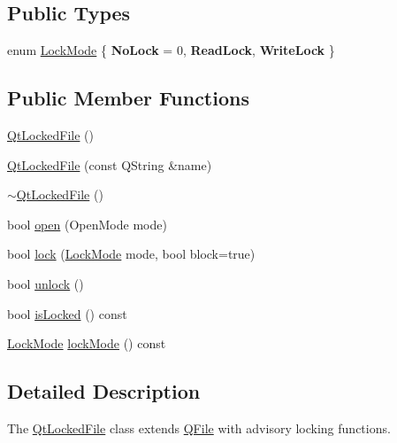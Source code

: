 \subsection*{Public Types}
\begin{DoxyCompactItemize}
\item 
enum \hyperlink{class_qt_l_p___private_1_1_qt_locked_file_ab9a54228983e33cf1fb8dace52141f26}{Lock\+Mode} \{ {\bfseries No\+Lock} = 0, 
{\bfseries Read\+Lock}, 
{\bfseries Write\+Lock}
 \}
\end{DoxyCompactItemize}
\subsection*{Public Member Functions}
\begin{DoxyCompactItemize}
\item 
\hyperlink{class_qt_l_p___private_1_1_qt_locked_file_a69bf1d82b1ca46f97466634d8f9587aa}{Qt\+Locked\+File} ()
\item 
\hyperlink{class_qt_l_p___private_1_1_qt_locked_file_a8b7a228ae02dca4bb99743219d0cdb7b}{Qt\+Locked\+File} (const Q\+String \&name)
\item 
\hyperlink{class_qt_l_p___private_1_1_qt_locked_file_ae22e087171c094da6cfb3282e838c9d4}{$\sim$\+Qt\+Locked\+File} ()
\item 
bool \hyperlink{class_qt_l_p___private_1_1_qt_locked_file_a2e81bbaa7b1aaa83cf79284e66dbad79}{open} (Open\+Mode mode)
\item 
bool \hyperlink{class_qt_l_p___private_1_1_qt_locked_file_af7876c08254a16d00022939f2fb9a8b8}{lock} (\hyperlink{class_qt_l_p___private_1_1_qt_locked_file_ab9a54228983e33cf1fb8dace52141f26}{Lock\+Mode} mode, bool block=true)
\item 
bool \hyperlink{class_qt_l_p___private_1_1_qt_locked_file_abb4d7e6211d9e6e14afaa661818fb2bf}{unlock} ()
\item 
bool \hyperlink{class_qt_l_p___private_1_1_qt_locked_file_ac93115b12ddd6c3275a5a81a94b6c919}{is\+Locked} () const 
\item 
\hyperlink{class_qt_l_p___private_1_1_qt_locked_file_ab9a54228983e33cf1fb8dace52141f26}{Lock\+Mode} \hyperlink{class_qt_l_p___private_1_1_qt_locked_file_aabfd6fb28f249a5fb01f3965de0e41f1}{lock\+Mode} () const 
\end{DoxyCompactItemize}


\subsection{Detailed Description}
The \hyperlink{class_qt_l_p___private_1_1_qt_locked_file}{Qt\+Locked\+File} class extends \hyperlink{class_q_file}{Q\+File} with advisory locking functions. 

